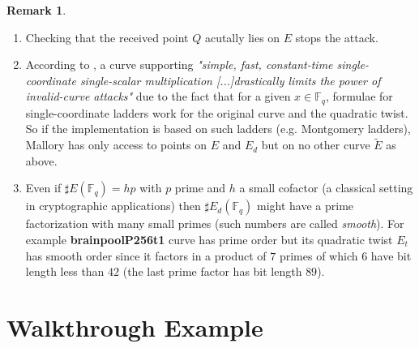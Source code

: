 \documentclass[10pt]{article}
\theoremstyle{definition}
\newtheorem{remark}{Remark}
\newcommand{\F}{\mathbb{F}}
\begin{document}
\begin{remark}
\begin{enumerate}
\item Checking that the received point $Q$ acutally lies on $E$ stops the attack.
\item According to \cite{cryptoeprint:2024/1265}, a curve supporting \textsl{"simple, fast, constant-time single-coordinate single-scalar multiplication [...]drastically limits the power of invalid-curve attacks"} due to the fact that for a given $x \in \F_q$, formulae for single-coordinate ladders work for the original curve and the quadratic twist.
So if the implementation is based on such ladders (e.g. Montgomery ladders), Mallory has only access to points on $E$ and $E_d$ but on no other curve $\tilde{E}$ as above.
\item Even if $\sharp{} E(\F_q) = hp$ with $p$ prime and $h$ a small cofactor (a classical setting in cryptographic applications) then $\sharp{}E_d(\F_q)$ might have a prime factorization with many small primes (such numbers are called \textsl{smooth}).
For example \textbf{brainpoolP256t1} curve has prime order but its quadratic twist $E_t$ has smooth order since it factors in a product of $7$ primes of which $6$ have bit length less than $42$ (the last prime factor has bit length $89$).
\end{enumerate}
\end{remark}

\section{Walkthrough Example}




\end{document}

